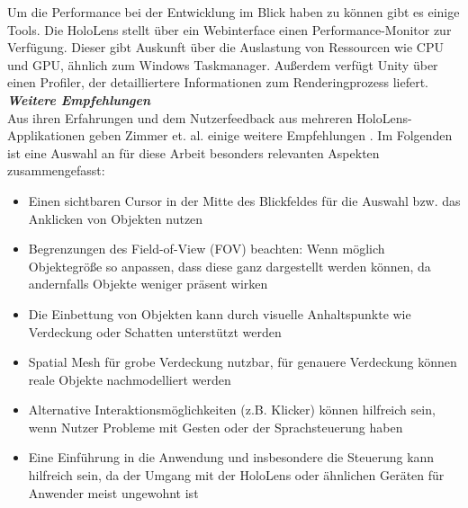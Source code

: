 Um die Performance bei der Entwicklung im Blick haben zu können gibt es einige Tools. Die HoloLens stellt über ein Webinterface einen Performance-Monitor zur Verfügung. Dieser gibt Auskunft über die Auslastung von Ressourcen wie CPU und GPU, ähnlich zum Windows Taskmanager. Außerdem verfügt Unity über einen Profiler, der detailliertere Informationen zum Renderingprozess liefert.\\

\textbf{\textit{Weitere Empfehlungen}}\\
Aus ihren Erfahrungen und dem Nutzerfeedback aus mehreren HoloLens-Applikationen geben Zimmer et. al. einige weitere Empfehlungen \cite{Zimmer17}. Im Folgenden ist eine Auswahl an für diese Arbeit besonders relevanten Aspekten zusammengefasst:
\begin{itemize}[topsep=-2px]
	\setlength{\itemsep}{-1pt}
	\singlespacing
	\item Einen sichtbaren Cursor in der Mitte des Blickfeldes für die Auswahl bzw. das Anklicken von Objekten nutzen
	\item Begrenzungen des Field-of-View (FOV) beachten: Wenn möglich Objektegröße so anpassen, dass diese ganz dargestellt werden können, da andernfalls Objekte weniger präsent wirken
	\item Die Einbettung von Objekten kann durch visuelle Anhaltspunkte wie Verdeckung oder Schatten unterstützt werden
	\item Spatial Mesh für grobe Verdeckung nutzbar, für genauere Verdeckung können reale Objekte nachmodelliert werden 
	\item Alternative Interaktionsmöglichkeiten (z.B. Klicker) können hilfreich sein, wenn Nutzer Probleme mit Gesten oder der Sprachsteuerung haben
	\item Eine Einführung in die Anwendung und insbesondere die Steuerung kann hilfreich sein, da der Umgang mit der HoloLens oder ähnlichen Geräten für Anwender meist ungewohnt ist
\end{itemize}
\vspace{6px}


